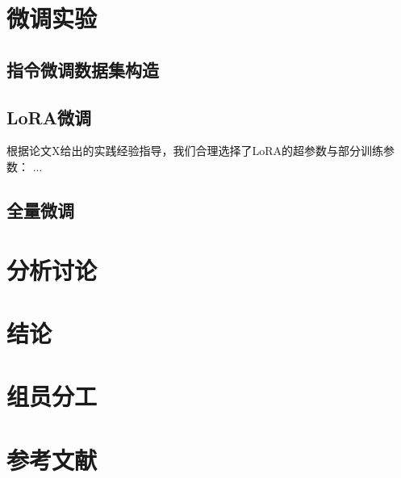 \documentclass{article}
\begin{document}
\section{微调实验}
\subsection{指令微调数据集构造}
\subsection{LoRA微调}
根据论文X给出的实践经验指导，我们合理选择了LoRA的超参数与部分训练参数：
...
\subsection{全量微调}
\section{分析讨论}

\section{结论}


\section{组员分工}

\section{参考文献}
\end{document}

